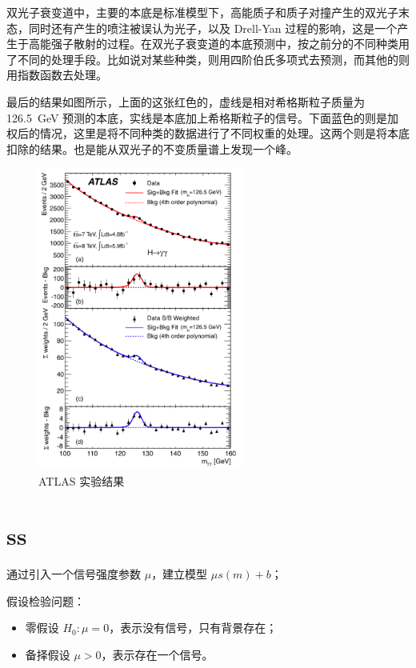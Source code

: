 \documentclass[oneside,a4paper,openany,11pt]{ctexbook}
\begin{document}
双光子衰变道中，主要的本底是标准模型下，高能质子和质子对撞产生的双光子末态，同时还有产生的喷注被误认为光子，以及 Drell-Yan 过程的影响，这是一个产生于高能强子散射的过程。在双光子衰变道的本底预测中，按之前分的不同种类用了不同的处理手段。比如说对某些种类，则用四阶伯氏多项式去预测，而其他的则用指数函数去处理。

最后的结果如图所示，上面的这张红色的，虚线是相对希格斯粒子质量为 \qty{126.5}{GeV} 预测的本底，实线是本底加上希格斯粒子的信号。下面蓝色的则是加权后的情况，这里是将不同种类的数据进行了不同权重的处理。这两个则是将本底扣除的结果。也是能从双光子的不变质量谱上发现一个峰。

\begin{figure}[htbp]
    \centering
    \includegraphics[width=0.6\textwidth]{pic/atlas.png}
    \caption{ATLAS 实验结果}
    \label{fig:ATLAS}
\end{figure}

\section{ss}

通过引入一个信号强度参数 $\mu$，建立模型 $\mu s(m) + b$；

假设检验问题：

\begin{itemize}
    \item 零假设 $H_0: \mu=0$，表示没有信号，只有背景存在；
    \item 备择假设 $\mu > 0$，表示存在一个信号。
\end{itemize}
\end{document}
